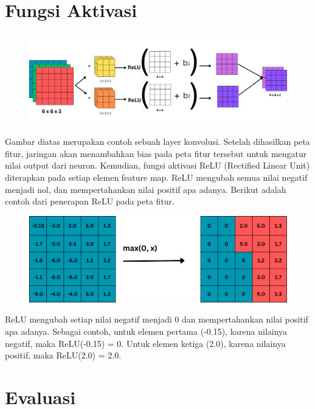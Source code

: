 
\section{Fungsi Aktivasi}

\begin{figure}[H]
	\centering
	\includegraphics[scale=.2]{gambar/lampiran/feed-fwrd.png}
\end{figure}

\noindent Gambar diatas merupakan contoh sebuah layer konvolusi. Setelah dihasilkan peta fitur, jaringan akan menambahkan bias pada peta fitur tersebut untuk mengatur nilai output dari neuron. Kemudian, fungsi aktivasi ReLU (Rectified Linear Unit) diterapkan pada setiap elemen feature map. ReLU mengubah semua nilai negatif menjadi nol, dan mempertahankan nilai positif apa adanya. Berikut adalah contoh dari penerapan ReLU pada peta fitur.

\begin{figure}[H]
	\centering
	\includegraphics[scale=.3]{gambar/lampiran/fungsi-relu.png}
\end{figure}

ReLU mengubah setiap nilai negatif menjadi 0 dan mempertahankan nilai positif apa adanya. Sebagai contoh, untuk elemen pertama (-0.15), karena nilainya negatif, maka ReLU(-0.15) = 0.  Untuk elemen ketiga (2.0), karena nilainya positif, maka ReLU(2.0) = 2.0.

\section{Evaluasi}
 
